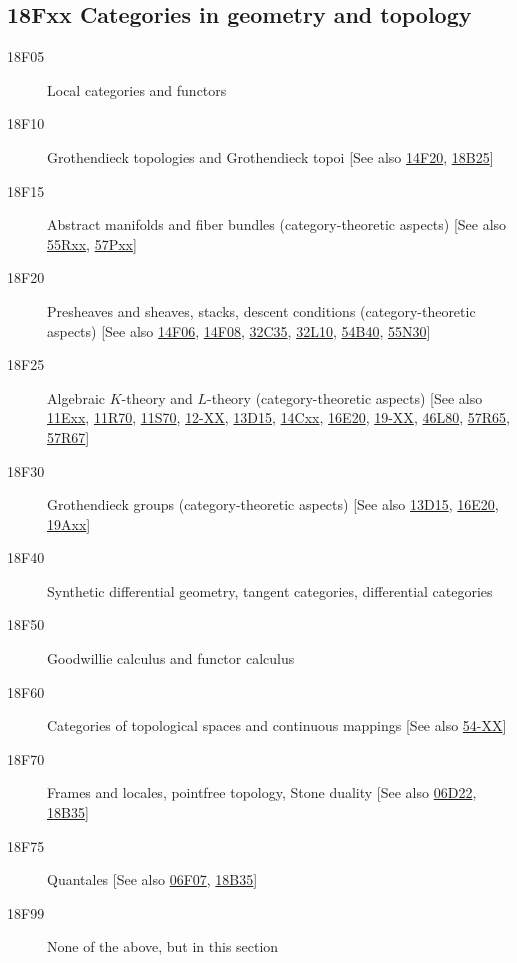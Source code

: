 \subsection*{18Fxx  Categories in geometry and topology}\label{18Fxx}
\begin{description}
\item [18F05]\label{18F05} Local categories and functors
\item [18F10]\label{18F10} Grothendieck topologies and Grothendieck topoi [See also \hyperref[14F20]{14F20}, \hyperref[18B25]{18B25}]
\item [18F15]\label{18F15} Abstract manifolds and fiber bundles (category-theoretic aspects) [See also \hyperref[55Rxx]{55Rxx}, \hyperref[57Pxx]{57Pxx}]
\item [18F20]\label{18F20} Presheaves and sheaves, stacks, descent conditions (category-theoretic aspects) [See also \hyperref[14F06]{14F06}, \hyperref[14F08]{14F08}, \hyperref[32C35]{32C35}, \hyperref[32L10]{32L10}, \hyperref[54B40]{54B40}, \hyperref[55N30]{55N30}]
\item [18F25]\label{18F25} Algebraic $K$-theory and $L$-theory (category-theoretic aspects) [See also \hyperref[11Exx]{11Exx}, \hyperref[11R70]{11R70}, \hyperref[11S70]{11S70}, \hyperref[12-XX]{12-XX}, \hyperref[13D15]{13D15}, \hyperref[14Cxx]{14Cxx}, \hyperref[16E20]{16E20}, \hyperref[19-XX]{19-XX}, \hyperref[46L80]{46L80}, \hyperref[57R65]{57R65}, \hyperref[57R67]{57R67}]
\item [18F30]\label{18F30} Grothendieck groups (category-theoretic aspects) [See also \hyperref[13D15]{13D15}, \hyperref[16E20]{16E20}, \hyperref[19Axx]{19Axx}]
\item [18F40]\label{18F40} Synthetic differential geometry, tangent categories, differential categories
\item [18F50]\label{18F50} Goodwillie calculus and functor calculus
\item [18F60]\label{18F60} Categories of topological spaces and continuous mappings [See also \hyperref[54-XX]{54-XX}]
\item [18F70]\label{18F70} Frames and locales, pointfree topology, Stone duality [See also \hyperref[06D22]{06D22}, \hyperref[18B35]{18B35}]
\item [18F75]\label{18F75} Quantales [See also \hyperref[06F07]{06F07}, \hyperref[18B35]{18B35}]
\item [18F99]\label{18F99} None of the above, but in this section
\end{description}
